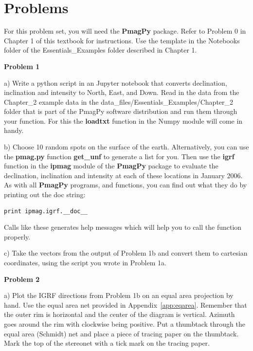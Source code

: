 \vskip 24pt
{\parindent 0pt \parskip 12pt 
\section{Problems}
 
For this problem set, you will need the {\bf PmagPy}  package.  Refer to Problem 0 in Chapter 1 of this textbook for instructions.   Use the template in the Notebooks folder of the Essentials\_Examples folder described in Chapter 1.  



{\bf Problem 1}


a) Write a python script in an Jupyter notebook
that converts
declination, inclination and intensity to North, East, and Down.   Read in the data from the Chapter\_2 example data in the data\_files/Essentials\_Examples/Chapter\_2 folder that is part of the PmagPy software distribution and run them through your function.  For this the {\bf loadtxt} function in the Numpy module will come in handy.   


b) Choose 10 random spots on the surface of the earth.  Alternatively, you can use the {\bf pmag.py} function {\bf get\_unf} to generate a list for you.  Then 
use the {\bf igrf} function  in the {\bf ipmag} module of the   {\bf PmagPy}  package to  evaluate  the declination, inclination and intensity at each of these locations in January 2006.  As with all {\bf PmagPy} programs, and functions, you can find out what they do by printing out the doc string:

\begin{verbatim}
print ipmag.igrf.__doc__
\end{verbatim}

\noindent  Calls like these generates  help messages which will help you to call the function properly.  



c) Take the vectors from the output of  Problem 1b and convert them to cartesian coordinates, using the  script you wrote in Problem 1a.  


{\bf Problem 2}

a) Plot the IGRF directions from Problem 1b  on an equal area projection by hand.    Use the equal area net provided in Appendix~\ref{app:eqarea}.   Remember that the outer rim is  horizontal and the center of the diagram is vertical.  Azimuth goes around the rim with clockwise being positive.    Put a  thumbtack through the equal area (Schmidt) net and place a piece of tracing paper on the thumbtack. Mark the top of the stereonet with a tick mark on the tracing paper. 

}

